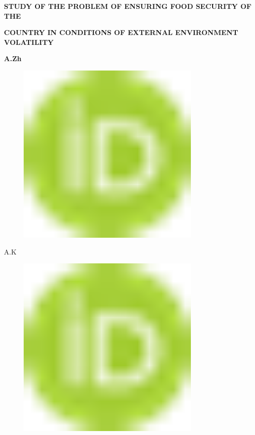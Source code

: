 
{\bfseries STUDY OF THE PROBLEM OF ENSURING FOOD SECURITY OF THE}

{\bfseries COUNTRY IN CONDITIONS OF EXTERNAL ENVIRONMENT VOLATILITY}

{\bfseries A.Zh
\begin{figure}[H]
	\centering
	\includegraphics[width=0.8\textwidth]{media/ekon3/image1}
	\caption*{}
\end{figure}

A.K
\begin{figure}[H]
	\centering
	\includegraphics[width=0.8\textwidth]{media/ekon3/image1}
	\caption*{}
\end{figure}

}
